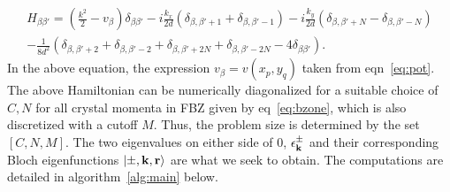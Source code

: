 \documentclass[a4paper,10pt]{article}
\begin{document}
\begin{multline}
\label{eq:hamilt}
H_{\beta \beta'} = \left(\frac{k^2}{2}-v_\beta\right)\delta_{\beta\beta'} - i\frac{k_x}{2d}\left(\delta_{\beta,\beta'+1}+\delta_{\beta,\beta'-1}\right)-i\frac{k_y}{2d}\left(\delta_{\beta,\beta'+N}-\delta_{\beta,\beta'-N}\right) \\
-\frac{1}{8d^2}\left(\delta_{\beta,\beta'+2}+\delta_{\beta,\beta'-2}+\delta_{\beta,\beta'+2N}+\delta_{\beta,\beta'-2N} - 4\delta_{\beta\beta'} \right).
\end{multline}
In the above equation, the expression $v_\beta = v(x_p,y_q)$ taken from eqn~\ref{eq:pot}. The above Hamiltonian can be numerically diagonalized for a suitable choice of $C,N$ for all crystal momenta in FBZ given by eq~\ref{eq:bzone}, which is also discretized with a cutoff $M$. Thus, the problem size is determined by the set $[C,N,M]$. The two eigenvalues on either side of $0$,  $\epsilon^\pm_{\bf k}$ and their corresponding Bloch eigenfunctions $|\pm, {\bf k},{\bf r}\rangle$ are what we seek to obtain. The computations are detailed in algorithm~\ref{alg:main} below. 
\end{document}
